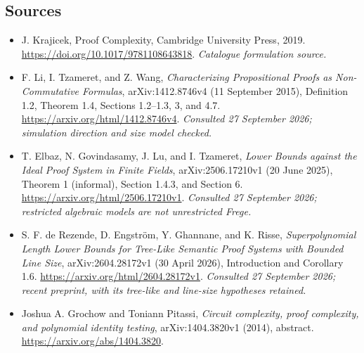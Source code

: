 \documentclass[11pt,a4paper]{article}
\numberwithin{equation}{section}
\begin{document}
\subsection{Sources}
\begin{itemize}\raggedright
\item[\textnormal{[S1]}]\hypertarget{source:30006730:1}{} J. Krajicek, Proof Complexity, Cambridge University Press, 2019.
\url{https://doi.org/10.1017/9781108643818}.
{\small\textit{Catalogue formulation source.}}
\item[\textnormal{[E1]}]\hypertarget{extra:30006730:1}{} F. Li, I. Tzameret, and Z. Wang,
\emph{Characterizing Propositional Proofs as Non-Commutative Formulas},
arXiv:1412.8746v4 (11 September 2015), Definition 1.2, Theorem 1.4,
Sections 1.2--1.3, 3, and 4.7.
\url{https://arxiv.org/html/1412.8746v4}.
{\small\textit{Consulted 27 September 2026; simulation direction and size model checked.}}
\item[\textnormal{[E2]}]\hypertarget{extra:30006730:2}{} T. Elbaz, N. Govindasamy,
J. Lu, and I. Tzameret, \emph{Lower Bounds against the Ideal Proof System in
Finite Fields}, arXiv:2506.17210v1 (20 June 2025), Theorem 1 (informal),
Section 1.4.3, and Section 6.
\url{https://arxiv.org/html/2506.17210v1}.
{\small\textit{Consulted 27 September 2026; restricted algebraic models are not unrestricted Frege.}}
\item[\textnormal{[E3]}]\hypertarget{extra:30006730:3}{} S. F. de Rezende,
D. Engstr\"om, Y. Ghannane, and K. Risse,
\emph{Superpolynomial Length Lower Bounds for Tree-Like Semantic Proof
Systems with Bounded Line Size}, arXiv:2604.28172v1 (30 April 2026),
Introduction and Corollary 1.6.
\url{https://arxiv.org/html/2604.28172v1}.
{\small\textit{Consulted 27 September 2026; recent preprint, with its tree-like and line-size hypotheses retained.}}

\item[\textnormal{[E4]}]\hypertarget{extra:30006730:4}{} Joshua A. Grochow and
Toniann Pitassi, \emph{Circuit complexity, proof complexity, and polynomial
identity testing}, arXiv:1404.3820v1 (2014), abstract.
\url{https://arxiv.org/abs/1404.3820}.
\end{itemize}
\end{document}
